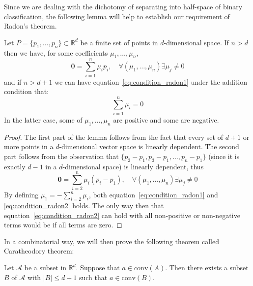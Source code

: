 Since we are dealing with the dichotomy of separating into half-space of binary classification, the following lemma will help to establish our requirement of Radon's theorem. 
\begin{lemma}\label{lem:lemma_cathedory_radon}
    Let $P=\{p_{1},\dots,p_{n}\}\subset \mathbb{R}^{d}$ be a finite set of points in $d$-dimensional space. If $n>d$ then we have, for some coefficients $\mu_{1},\dots,\mu_{n}$, 
    \begin{equation}
        \mathbf{0} = \sum^{n}_{i=1} \mu_{i}p_{i}, \quad \forall(\mu_{1},\dots,\mu_{n}) \exists \mu_{j} \neq 0 \label{eq:condition_radon1}
    \end{equation}
    and if $n>d+1$ we can have equation~\ref{eq:condition_radon1} under the addition condition that: 
    \begin{equation}
        \sum^{n}_{i=1} \mu_{i} = 0
        \label{eq:condition_radon2}
    \end{equation}
    In the latter case, some of $\mu_{1},\dots,\mu_{n}$ are positive and some are negative. 
\end{lemma}
\begin{proof}
    The first part of the lemma follows from the fact that every set of $d+1$ or more points in a $d$-dimensional vector space is linearly dependent. The second part follows from the observation that $\{p_{2}-p_{1},p_{3}-p_{1},\dots,p_{n}-p_{1}\}$ (since it is exactly $d-1$ in a $d$-dimensional space) is linearly dependent, thus 
    \begin{equation}
        \mathbf{0} = \sum^{n}_{i=2} \mu_{i}(p_{i}-p_{1}), \quad \forall(\mu_{1},\dots,\mu_{n}) \exists \mu_{j} \neq 0
    \end{equation}
    By defining $\mu_{1}=-\sum^{n}_{i=2}\mu_{i}$, both equation~\ref{eq:condition_radon1} and \ref{eq:condition_radon2} holds. The only way then that equation~\ref{eq:condition_radon2} can hold with all non-positive or non-negative terms would be if all terms are zero. 
\end{proof}

In a combinatorial way, we will then prove the following theorem called Caratheodory theorem: 
\begin{theorem}[Caratheodory]
    Let $\mathcal{A}$ be a subset in $\mathbb{R}^{d}$. Suppose that $a\in \mathrm{conv}(A)$. Then there exists a subset $B$ of $\mathcal{A}$ with $\lvert B \rvert \leq d+1$ such that $a\in \mathrm{conv}(B)$.
\end{theorem}


